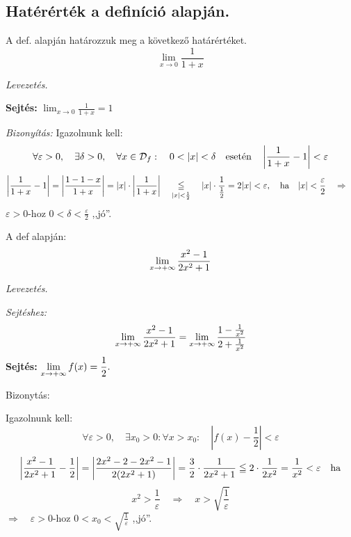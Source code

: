 \documentclass[a4paper,11.5pt]{article}
\begin{document}
	\subsection{Hatérérték a definíció alapján.}
		\begin{task}
			A def. alapján határozzuk meg a következő határértéket.
			\[ \lim_{x\to0}\frac{1}{1+x} \]
			
			\textit{Levezetés.} 
			
			\textbf{Sejtés:} $\displaystyle \lim_{x\to0}\frac{1}{1+x}=1$
			
			\textit{Bizonyítás:} 
			Igazolnunk kell: 
			\[ \forall \varepsilon>0,\quad \exists \delta>0, \quad \forall x\in\mathcal{D}_f:\quad 0<|x|<\delta \text{\quad esetén\quad } \left|\frac{1}{1+x}-1\right|<\varepsilon \]
			\[ \left|\frac{1}{1+x}-1\right| = \left|\frac{1-1-x}{1+x}\right| = |x|\cdot\left|\frac{1}{1+x}\right|\quad \underset{|x|<\frac{1}{2}}{\leqq} \quad |x|\cdot \frac{1}{\frac{1}{2}} = 2|x|<\varepsilon,\text{\quad ha\quad }|x|<\frac{\varepsilon}{2}\quad \Rightarrow\quad  \]
			$\varepsilon>0$-hoz $0<\delta<\frac{\varepsilon}{2}$ ,,jó''.
		\end{task}
		\begin{task}
			A def alapján:
			\[ \displaystyle\lim_{x\to +\infty}\frac{x^2-1}{2x^2+1} \]
			
			\textit{Levezetés.}
			
			\textit{Sejtéshez:} 
			\[ \displaystyle\lim_{x\to +\infty}\frac{x^2-1}{2x^2+1}=\displaystyle\lim_{x\to +\infty}\frac{1-\frac{1}{x^2}}{2+\frac{1}{x^2}} \]
			\textbf{Sejtés:} $\displaystyle\lim_{x\to +\infty} f(x)=\frac{1}{2}.$
			
			Bizonytás:
			
			Igazolnunk kell:
			\[ \forall\varepsilon>0, \quad \exists x_0>0: \forall x>x_0:\quad \left|f(x)-\frac{1}{2}\right|<\varepsilon \]
			\[ \left|\frac{x^2-1}{2x^2+1}-\frac{1}{2}\right| = \left|\frac{2x^2-2-2x^2-1}{2(2x^2+1)}\right| = \frac{3}{2}\cdot \frac{1}{2x^2+1}\leqq 2\cdot \frac{1}{2x^2}  =\frac{1}{x^2}<\varepsilon\text{\quad ha}\]
			\[ x^2>\frac{1}{\varepsilon}\quad \Rightarrow\quad x>\sqrt{\frac{1}{\varepsilon}} \]
			$\Rightarrow\quad \varepsilon>0$-hoz $0<x_0<\sqrt{\frac{1}{\varepsilon}}$ ,,jó''.
		\end{task}
\end{document}
